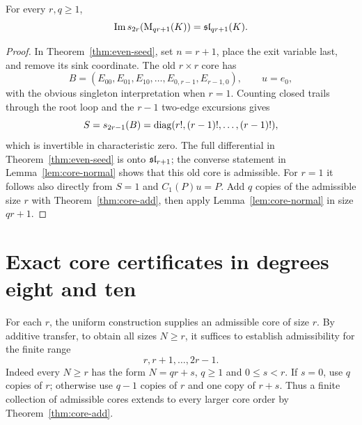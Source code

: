 \begin{corollary}\label{cor:congruence}
For every $r,q\ge1$,
\begin{equation}\label{eq:congruence}
 \operatorname{Im} s_{2r}(\mathrm{M}_{qr+1}(K))=\mathfrak{sl}_{qr+1}(K).
\end{equation}
\end{corollary}
\begin{proof}
In Theorem~\ref{thm:even-seed}, set $n=r+1$, place the
exit variable last, and remove its sink coordinate. The old
$r\times r$ core has
\begin{equation}\label{eq:core-star}
 B=(E_{00},E_{01},E_{10},\ldots,E_{0,r-1},E_{r-1,0}),
 \qquad u=e_0,
\end{equation}
with the obvious singleton interpretation when $r=1$.
Counting closed trails through the root loop and the $r-1$
two-edge excursions gives
\begin{equation}\label{eq:core-star-endpoint}
 S=s_{2r-1}(B)
 =\operatorname{diag}(r!,(r-1)!,\ldots,(r-1)!),
\end{equation}
which is invertible in characteristic zero.
The full differential in Theorem~\ref{thm:even-seed} is onto
$\mathfrak{sl}_{r+1}$; the converse statement in
Lemma~\ref{lem:core-normal} shows that this old core is
admissible. For $r=1$ it follows also directly from
$S=1$ and $C_1(P)u=P$. Add $q$ copies of the admissible
size $r$ with Theorem~\ref{thm:core-add}, then apply
Lemma~\ref{lem:core-normal} in size $qr+1$.
\end{proof}

\section{Exact core certificates in degrees eight and ten}\label{sec:even-low}
For each $r$, the uniform construction supplies an admissible core
of size $r$. By additive transfer, to obtain all sizes $N\ge r$,
it suffices to establish admissibility for the finite range
\begin{equation}\label{eq:core-finite-reduction}
 r,r+1,\ldots,2r-1.
\end{equation}
Indeed every $N\ge r$ has the form $N=qr+s$,
$q\ge1$ and $0\le s<r$. If $s=0$, use $q$ copies of
$r$; otherwise use $q-1$ copies of $r$ and one copy of $r+s$.
Thus a finite collection of admissible cores extends to every
larger core order by Theorem~\ref{thm:core-add}.

